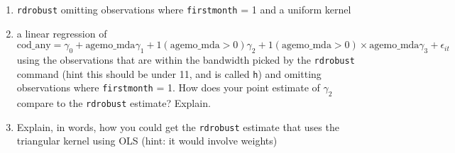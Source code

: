 \documentclass[11pt, a4paper]{article}
\begin{document}
\begin{enumerate}
\begin{enumerate}
    \begin{enumerate}
    \item \texttt{rdrobust} omitting observations where \texttt{firstmonth} = 1 and a uniform kernel
    \item     a linear regression of
    \begin{equation}
      \text{cod\_any} = \gamma_0 + \text{agemo\_mda}\gamma_{1} + 1(\text{agemo\_mda} > 0)\gamma_{2} + 1(\text{agemo\_mda} > 0)\times \text{agemo\_mda}\gamma_{3} + \epsilon_{it}
    \end{equation}
    using the observations that are within the bandwidth picked by the
    \texttt{rdrobust} command (hint this should be under 11, and is
    called \texttt{h}) and omitting observations where
    \texttt{firstmonth} = 1. How does your point estimate of
    $\gamma_{2}$ compare to the \texttt{rdrobust} estimate? Explain.
  \item Explain, in words, how you could get the \texttt{rdrobust}
    estimate that uses the triangular kernel using OLS (hint: it would
    involve weights)
  \end{enumerate}
\end{enumerate}
\end{enumerate}
\end{document}
